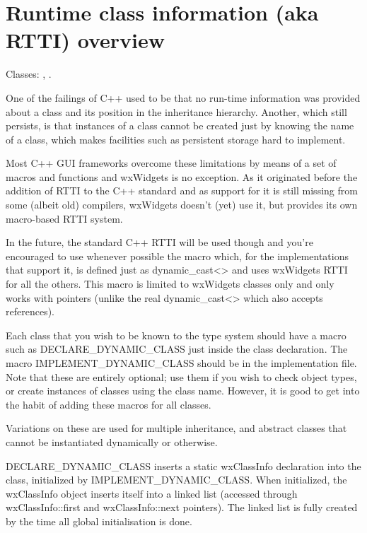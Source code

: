 \section{Runtime class information (aka RTTI) overview}\label{runtimeclassoverview}

Classes: , .

One of the failings of C++ used to be that no run-time information was provided
about a class and its position in the inheritance hierarchy.
Another, which still persists, is that instances of a class cannot be created
just by knowing the name of a class, which makes facilities such as persistent
storage hard to implement.

Most C++ GUI frameworks overcome these limitations by means of a set of
macros and functions and wxWidgets is no exception. As it originated before the
addition of RTTI to the C++ standard and as support for it is still missing from
some (albeit old) compilers, wxWidgets doesn't (yet) use it, but provides its
own macro-based RTTI system.

In the future, the standard C++ RTTI will be used though and you're encouraged
to use whenever possible the  macro which,
for the implementations that support it, is defined just as dynamic\_cast<> and
uses wxWidgets RTTI for all the others. This macro is limited to wxWidgets
classes only and only works with pointers (unlike the real dynamic\_cast<> which
also accepts references).

Each class that you wish to be known to the type system should have
a macro such as DECLARE\_DYNAMIC\_CLASS just inside the class declaration.
The macro IMPLEMENT\_DYNAMIC\_CLASS should be in the implementation file.
Note that these are entirely optional; use them if you wish to check object
types, or create instances of classes using the class name. However,
it is good to get into the habit of adding these macros for all classes.

Variations on these  are used for multiple inheritance, and abstract
classes that cannot be instantiated dynamically or otherwise.

DECLARE\_DYNAMIC\_CLASS inserts a static wxClassInfo declaration into the
class, initialized by IMPLEMENT\_DYNAMIC\_CLASS. When initialized, the
wxClassInfo object inserts itself into a linked list (accessed through
wxClassInfo::first and wxClassInfo::next pointers). The linked list
is fully created by the time all global initialisation is done.

